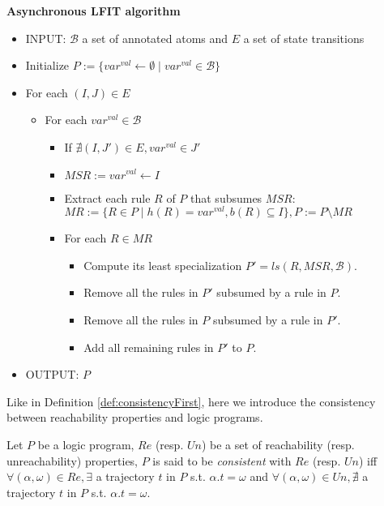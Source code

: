 \vspace{0.5em}
\noindent
\textbf{Asynchronous LFIT algorithm}
\vspace{-0.4em}
\begin{itemize}
	\item INPUT: $\mathcal{B}$ a set of annotated atoms and $E$ a set of state transitions
	\item Initialize $P := \{var^{val} \leftarrow \emptyset \mid var^{val} \in \mathcal{B}\}$
	\item For each $(I,J) \in E$
	\begin{itemize}
		\item For each $var^{val} \in \mathcal{B}$
		\begin{itemize}
			\item If $\nexists (I,J') \in E, var^{val} \in J'$
			\item $MSR := var^{val} \leftarrow I$
			\item Extract each rule $R$ of $P$ that subsumes $MSR$: $MR := \{R \in P \mid h(R) = var^{val}, b(R) \subseteq I\}, P := P \setminus MR$
			\item For each $R \in MR$
			\begin{itemize}
				\item Compute its least specialization $P'=ls(R,MSR,\mathcal{B})$.
				\item Remove all the rules in $P'$ subsumed by a rule in $P$.
				\item Remove all the rules in $P$ subsumed by a rule in $P'$.
				\item Add all remaining rules in $P'$ to $P$.
			\end{itemize}
		\end{itemize}
	\end{itemize}
	\item OUTPUT: $P$
\end{itemize}

Like in Definition \ref{def:consistencyFirst}, here we introduce the consistency between reachability properties and logic programs.

\begin{definition}
Let $P$ be a logic program, $Re$ (resp. $Un$) be a set of reachability (resp. unreachability) properties, $P$ is said to be {\em consistent} with $Re$ (resp. $Un$) iff
$\forall (\alpha,\omega) \in Re, \exists$ a trajectory $t$ in $P$ s.t. $\alpha.t=\omega$ and 
$\forall (\alpha,\omega) \in Un, \nexists$ a trajectory $t$ in $P$ s.t. $\alpha.t=\omega$.
\end{definition}

